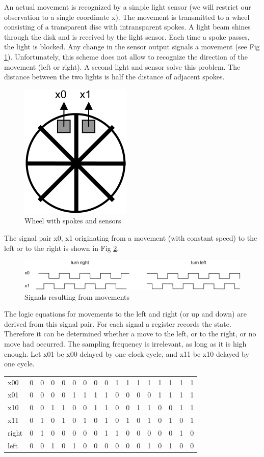An actual movement is recognized by a simple light sensor (we will restrict our observation to a
single coordinate x). The movement is transmitted to a wheel consisting of a transparent disc with
intransparent spokes. A light beam shines through the disk and is received by the light sensor.
Each time a spoke passes, the light is blocked. Any change in the sensor output signals a
movement (see Fig \ref{fig:wheel}). Unfortunately, this scheme does not allow to recognize the direction
of the movement (left or right). A second light and sensor solve this problem. The distance between
the two lights is half the distance of adjacent spokes.
\begin{figure}[h!]
  \centering
  \includegraphics[width=.25\textwidth]{i/G/4.png}
  \caption{Wheel with spokes and sensors}
  \label{fig:wheel}
\end{figure}

The signal pair x0, x1 originating from a movement (with constant speed) to the left or to the right is
shown in Fig \ref{fig:sig}.
\begin{figure}[h!]
  \centering
  \includegraphics[width=\textwidth]{i/G/5.png}
  \caption{Signals resulting from movements}
  \label{fig:sig}
\end{figure}

The logic equations for movements to the left and right (or up and down) are derived from this signal
pair. For each signal a register records the state. Therefore it can be determined whether a move to
the left, or to the right, or no move had occurred. The sampling frequency is irrelevant, as long as it is
high enough. Let x01 be x00 delayed by one clock cycle, and x11 be x10 delayed by one cycle.
\begin{table}[h!]
  \centering
  \begin{tabular}{l  c c c c  c c c c  c c c c  c c c c}
    x00  & 0 & 0 & 0 & 0 & 0 & 0 & 0 & 0 & 1 & 1 & 1 & 1 & 1 & 1 & 1 & 1 \\
    x01  & 0 & 0 & 0 & 0 & 1 & 1 & 1 & 1 & 0 & 0 & 0 & 0 & 1 & 1 & 1 & 1 \\
    x10  & 0 & 0 & 1 & 1 & 0 & 0 & 1 & 1 & 0 & 0 & 1 & 1 & 0 & 0 & 1 & 1 \\
    x11  & 0 & 1 & 0 & 1 & 0 & 1 & 0 & 1 & 0 & 1 & 0 & 1 & 0 & 1 & 0 & 1 \\\hline
    right& 0 & 1 & 0 & 0 & 0 & 0 & 0 & 1 & 1 & 0 & 0 & 0 & 0 & 0 & 1 & 0 \\
    left & 0 & 0 & 1 & 0 & 1 & 0 & 0 & 0 & 0 & 0 & 0 & 1 & 0 & 1 & 0 & 0
  \end{tabular}
\end{table}

